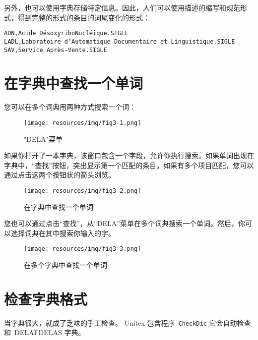 另外，也可以使用字典存储特定信息。因此，人们可以使用描述的缩写和规范形式，得到完整的形式的条目的词尾变化的形式：

\bigskip
\begin{verbatim}
ADN,Acide DésoxyriboNucléique.SIGLE
LADL,Laboratoire d’Automatique Documentaire et Linguistique.SIGLE
SAV,Service Après-Vente.SIGLE
\end{verbatim}



\section{在字典中查找一个单词}
\label{section-dictionary-lookup}
您可以在多个词典用两种方式搜索一个词：

\begin{figure}[h!]
\begin{center}
\texttt{[image: resources/img/fig3-1.png]}
\caption{"DELA"菜单}
\end{center}
\end{figure}

\bigskip
\noindent
如果你打开了一本字典，该窗口包含一个字段，允许你执行搜索。如果单词出现在字典中，“查找”按钮，突出显示第一个匹配的条目。如果有多个项目匹配，您可以通过点击这两个按钮状的箭头浏览。
\begin{figure}[h!]
\begin{center}
\texttt{[image: resources/img/fig3-2.png]}
\caption{在字典中查找一个单词}
\end{center}
\end{figure}

\bigskip
\noindent
您也可以通过点击“查找”，从“DELA”菜单在多个词典搜索一个单词。然后，你可以选择词典在其中搜索你输入的字。

\begin{figure}[h!]
\begin{center}
\texttt{[image: resources/img/fig3-3.png]}
\caption{在多个字典中查找一个单词}
\end{center}
\end{figure}

\bigskip
\noindent





\section{检查字典格式}
 
当字典很大，就成了乏味的手工检查。 Unitex 包含程序\ \verb+CheckDic+
 它会自动检查和\ DELAFDELAS 字典。

